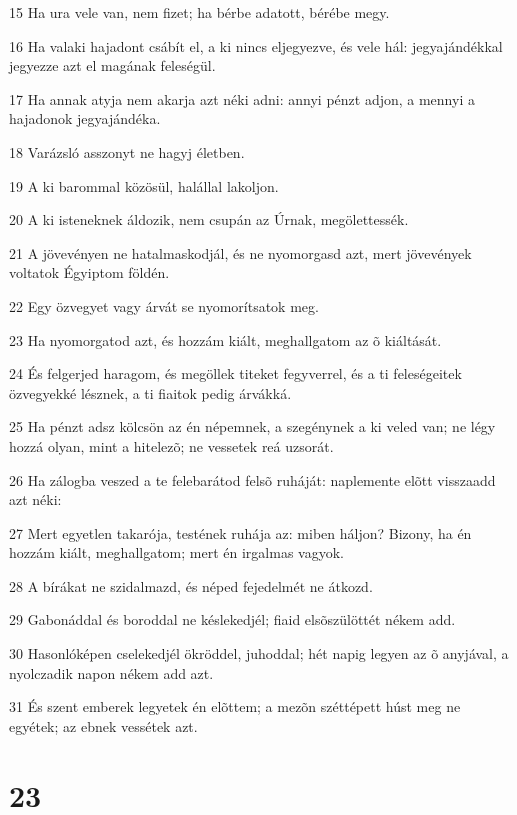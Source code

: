 \par 15 Ha ura vele van, nem fizet; ha bérbe adatott, bérébe megy.
\par 16 Ha valaki hajadont csábít el, a ki nincs eljegyezve, és vele hál: jegyajándékkal jegyezze azt el magának feleségül.
\par 17 Ha annak atyja nem akarja azt néki adni: annyi pénzt adjon, a mennyi a hajadonok jegyajándéka.
\par 18 Varázsló asszonyt ne hagyj életben.
\par 19 A ki barommal közösül, halállal lakoljon.
\par 20 A ki isteneknek áldozik, nem csupán az Úrnak, megölettessék.
\par 21 A jövevényen ne hatalmaskodjál, és ne nyomorgasd azt, mert jövevények voltatok Égyiptom földén.
\par 22 Egy özvegyet vagy árvát se nyomorítsatok meg.
\par 23 Ha nyomorgatod azt, és hozzám kiált, meghallgatom az õ kiáltását.
\par 24 És felgerjed haragom, és megöllek titeket fegyverrel, és a ti feleségeitek özvegyekké lésznek, a ti fiaitok pedig árvákká.
\par 25 Ha pénzt adsz kölcsön az én népemnek, a szegénynek a ki veled van; ne légy hozzá olyan, mint a hitelezõ; ne vessetek reá uzsorát.
\par 26 Ha zálogba veszed a te felebarátod felsõ ruháját: naplemente elõtt visszaadd azt néki:
\par 27 Mert egyetlen takarója, testének ruhája az: miben háljon? Bizony, ha én hozzám kiált, meghallgatom; mert én irgalmas vagyok.
\par 28 A bírákat ne szidalmazd, és néped fejedelmét ne átkozd.
\par 29 Gabonáddal és boroddal ne késlekedjél; fiaid elsõszülöttét nékem add.
\par 30 Hasonlóképen cselekedjél ökröddel, juhoddal; hét napig legyen az õ anyjával, a nyolczadik napon nékem add azt.
\par 31 És szent emberek legyetek én elõttem; a mezõn széttépett húst meg ne egyétek; az ebnek vessétek azt.

\chapter{23}

